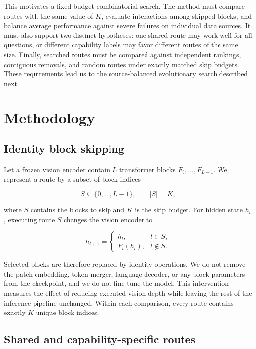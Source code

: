 \documentclass[10pt]{article}
\begin{document}
This motivates a fixed-budget combinatorial search. The method must
compare routes with the same value of \(K\), evaluate interactions among
skipped blocks, and balance average performance against severe failures
on individual data sources. It must also support two distinct
hypotheses: one shared route may work well for all questions, or
different capability labels may favor different routes of the same size.
Finally, searched routes must be compared against independent rankings,
contiguous removals, and random routes under exactly matched skip
budgets. These requirements lead us to the source-balanced evolutionary
search described next.

\section{Methodology}\label{methodology}

\subsection{Identity block skipping}\label{identity-block-skipping}

Let a frozen vision encoder contain \(L\) transformer blocks
\(F_0,\ldots,F_{L-1}\). We represent a route by a subset of block
indices

\[
S \subseteq \{0,\ldots,L-1\}, \qquad |S|=K,
\]

where \(S\) contains the blocks to skip and \(K\) is the skip budget.
For hidden state \(h_l\), executing route \(S\) changes the vision
encoder to

\[
h_{l+1} =
\begin{cases}
h_l, & l \in S,\\
F_l(h_l), & l \notin S.
\end{cases}
\]

Selected blocks are therefore replaced by identity operations. We do not
remove the patch embedding, token merger, language decoder, or any block
parameters from the checkpoint, and we do not fine-tune the model. This
intervention measures the effect of reducing executed vision depth while
leaving the rest of the inference pipeline unchanged. Within each
comparison, every route contains exactly \(K\) unique block indices.

\subsection{Shared and capability-specific routes}\label{shared-and-capability-specific-routes}
\end{document}
